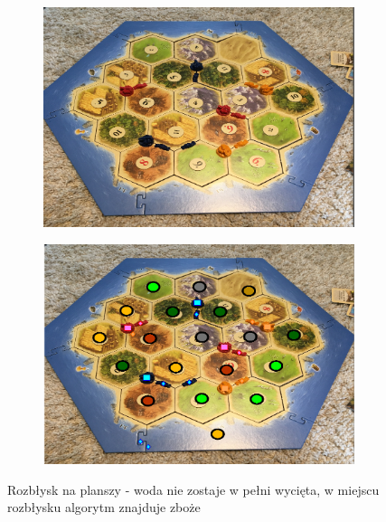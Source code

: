 \documentclass[a4paper]{article}
\begin{document}
	 \begin{figure}[H]
        \begin{subfigure}[]{0.5\linewidth}
        \includegraphics[width=\linewidth]{pictures/fields/flash.png}
        \end{subfigure}
        \begin{subfigure}[]{0.5\linewidth}
        \includegraphics[width=\linewidth]{pictures/fields/after_flash.png}
        \end{subfigure}

        \caption{Rozbłysk na planszy - woda nie zostaje w pełni wycięta, w miejscu rozbłysku
        algorytm znajduje zboże}
        \label{fig:problem_light}
    \end{figure}
    
\end{document}
